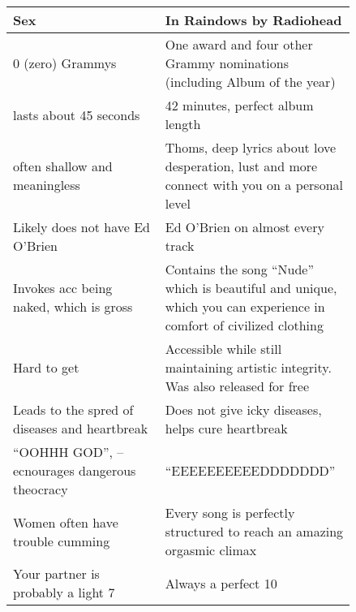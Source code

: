 \begin{table}[ht]
    \centering
    \begin{tabular}{p{0.42\linewidth}|p{0.42\linewidth}}
        \textbf{Sex} & \textbf{In Raindows} by \textbf{Radiohead} \\
        \hline
        $0$ (zero) Grammys & One award and four other Grammy nominations (including Album of the year) \\[2mm]
        lasts about 45 seconds & 42 minutes, perfect album length \\[2mm]
        often shallow and meaningless & Thoms, deep lyrics about love desperation, lust and more connect with you on a personal level \\[2mm]
        Likely does not have Ed O'Brien & Ed O'Brien on almost every track \\[2mm]
        Invokes acc being naked, which is gross & Contains the song ``Nude'' which is beautiful and unique, which you can experience in comfort of civilized clothing \\[2mm]
        Hard to get & Accessible while still maintaining artistic integrity. Was also released for free \\[2mm]
        Leads to the spred of diseases and heartbreak & Does not give icky diseases, helps cure heartbreak \\[2mm]
        ``OOHHH GOD'', -- ecnourages dangerous theocracy & ``EEEEEEEEEEDDDDDDD'' \\[2mm]
        Women often have trouble cumming & Every song is perfectly structured to reach an amazing orgasmic climax \\[2mm]
        Your partner is probably a light 7 & Always a perfect 10
    \end{tabular}
    \label{tab:sex}
\end{table}
